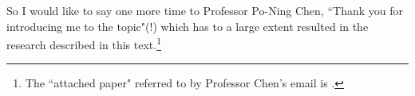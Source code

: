 So I would like to say one more time to %
Professor Po-Ning Chen, 
``Thank you for introducing me to the topic"(!)
which has to a large extent resulted in the research described in this text.\footnote{%
  The ``attached paper" referred to by Professor Chen's email is .}

%
%






